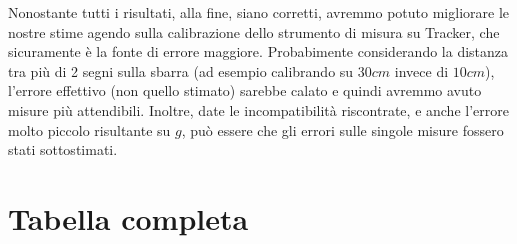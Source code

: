 \documentclass[12pt, a4paper]{article}
\begin{document}
Nonostante tutti i risultati, alla fine, siano corretti, avremmo potuto migliorare le nostre stime agendo sulla calibrazione dello strumento di misura su Tracker, che  sicuramente è la fonte di errore maggiore. Probabimente considerando la distanza tra più di 2 segni sulla sbarra (ad esempio calibrando su $30cm$ invece di $10cm$), l'errore effettivo (non quello stimato) sarebbe calato e quindi avremmo avuto misure più attendibili.
Inoltre, date le incompatibilità riscontrate, e anche l'errore molto piccolo risultante su $g$, può essere che gli errori sulle singole misure fossero stati sottostimati.




\newpage

\section{Tabella completa}
\end{document}
